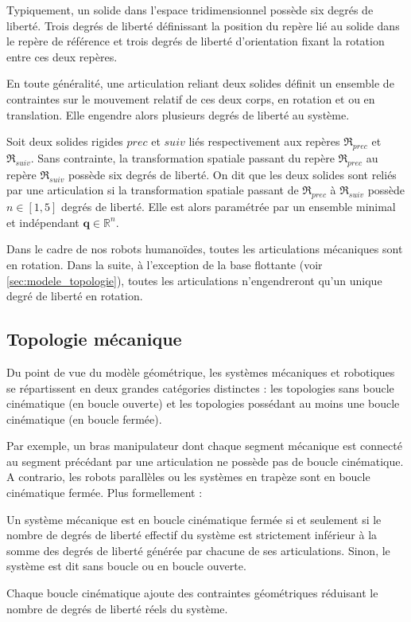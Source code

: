 Typiquement, un solide dans l'espace tridimensionnel possède six degrés de liberté.
Trois degrés de liberté définissant la position du repère lié au solide dans le repère 
de référence et trois degrés de liberté d'orientation fixant la rotation entre 
ces deux repères.

En toute généralité, une articulation reliant deux solides définit un
ensemble de contraintes sur le mouvement relatif de ces deux corps, 
en rotation et ou en translation. 
Elle engendre alors plusieurs degrés de liberté au système.
\begin{definition}
    Soit deux solides rigides $prec$ et $suiv$ liés respectivement 
    aux repères $\mathfrak{R}_{prec}$ et $\mathfrak{R}_{suiv}$.
    Sans contrainte, la transformation spatiale passant du repère
    $\mathfrak{R}_{prec}$ au repère $\mathfrak{R}_{suiv}$ possède
    six degrés de liberté.
    On dit que les deux solides sont reliés par une articulation si
    la transformation spatiale passant de $\mathfrak{R}_{prec}$ 
    à $\mathfrak{R}_{suiv}$ possède $n \in [1,5]$ degrés de liberté.
    Elle est alors paramétrée par un ensemble minimal et indépendant $\bm{q} \in \mathbb{R}^n$.
\end{definition}

Dans le cadre de nos robots humanoïdes, toutes les articulations
mécaniques sont en rotation. 
Dans la suite, à l'exception de la base flottante 
(voir \ref{sec:modele_topologie}), toutes les articulations 
n'engendreront qu'un unique degré de liberté en rotation.

\subsection{Topologie mécanique\label{sec:modele_topologie}}

Du point de vue du modèle géométrique, les systèmes mécaniques et robotiques se répartissent 
en deux grandes catégories distinctes : les topologies sans boucle cinématique (en boucle ouverte)
et les topologies possédant au moins une boucle cinématique (en boucle fermée).

Par exemple, un bras manipulateur dont chaque segment mécanique 
est connecté au segment précédant par une articulation ne possède 
pas de boucle cinématique. 
A contrario, les robots parallèles ou les systèmes 
en trapèze sont en boucle cinématique fermée.
Plus formellement :

\begin{definition}
    Un système mécanique est en boucle cinématique fermée si et seulement si
    le nombre de degrés de liberté effectif du système est strictement 
    inférieur à la somme des degrés de liberté générée par chacune de ses articulations.
    Sinon, le système est dit sans boucle ou en boucle ouverte.
\end{definition}
Chaque boucle cinématique ajoute des contraintes géométriques réduisant
le nombre de degrés de liberté réels du système.\\

